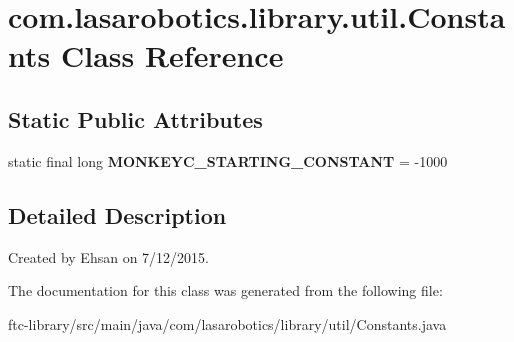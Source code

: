 \hypertarget{classcom_1_1lasarobotics_1_1library_1_1util_1_1_constants}{}\section{com.\+lasarobotics.\+library.\+util.\+Constants Class Reference}
\label{classcom_1_1lasarobotics_1_1library_1_1util_1_1_constants}
\subsection*{Static Public Attributes}
\begin{DoxyCompactItemize}
\item 
\hypertarget{classcom_1_1lasarobotics_1_1library_1_1util_1_1_constants_af28b5fa0ba4271a59373443aa779bea5}{}static final long {\bfseries M\+O\+N\+K\+E\+Y\+C\+\_\+\+S\+T\+A\+R\+T\+I\+N\+G\+\_\+\+C\+O\+N\+S\+T\+A\+N\+T} = -\/1000\label{classcom_1_1lasarobotics_1_1library_1_1util_1_1_constants_af28b5fa0ba4271a59373443aa779bea5}

\end{DoxyCompactItemize}


\subsection{Detailed Description}
Created by Ehsan on 7/12/2015. 

The documentation for this class was generated from the following file\+:\begin{DoxyCompactItemize}
\item 
ftc-\/library/src/main/java/com/lasarobotics/library/util/Constants.\+java\end{DoxyCompactItemize}
